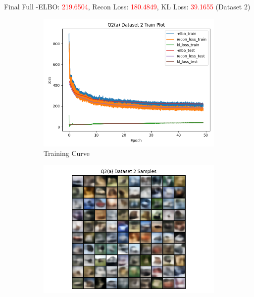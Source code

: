 \documentclass{article}
\begin{document}
\begin{enumerate}[(a)]
     \newpage

     Final Full -ELBO: \textcolor{red}{219.6504}, Recon Loss: \textcolor{red}{180.4849}, KL Loss: \textcolor{red}{39.1655} (Dataset 2)
     \begin{figure}[H]
            \centering
            \begin{subfigure}[b]{0.475\textwidth}
                \centering
                \includegraphics[width=\textwidth]{figures/q2_a_dset2_train_plot.png}
                \caption{Training Curve}
            \end{subfigure}
            \hfill
            \begin{subfigure}[b]{0.475\textwidth}
                \centering
                \includegraphics[width=\textwidth]{figures/q2_a_dset2_samples.png}

\end{subfigure}
\end{figure}
\end{enumerate}
\end{document}
